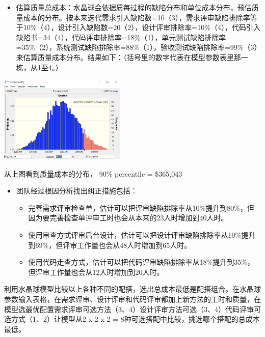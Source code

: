 \begin{itemize}
\tightlist
\item
  估算质量总成本：水晶球会依据质每过程的缺陷分布和单位成本分布，预估质量成本的分布。按本来迭代需求引入缺陷数=10（3），需求评审缺陷排除率等于10\%（4），设计引入缺陷数=20（2），设计评审排除率=10\%（4），代码引入缺陷书=34（4），代码评审排除率=18\%（1），单元测试缺陷排除率=35\%（2），系统测试缺陷排除率=88\%（1），验收测试缺陷排除率=99\%（3）来估算质量成本分布。结果如下：（括号里的数字代表在模型参数表里那一栋，从1至4。）
\end{itemize}



\includegraphics[width=6cm]{startQUA.PNG}

从上图看到质量成本的分布， 90\% percentile = \$365,043

\begin{itemize}
\tightlist
\item
  团队经过根因分析找出纠正措施包括：

  \begin{itemize}
  \tightlist
  \item
    完善需求评审检查单，估计可以把评审缺陷排除率从10\%提升到80\%，但因为要完善检查单评审工时也会从本来的23人时增加到40人时。
  \item
    使用审查方式评审后台设计，估计可以把设计评审缺陷排除率从10\%提升到69\%，但评审工作量也会从48人时增加到65人时。
  \item
    使用代码走查方式，估计可以把代码评审缺陷排除率从18\%提升到35\%，但评审工作量也会从12人时增加到20人时。
  \end{itemize}
\end{itemize}

利用水晶球模型比较以上各种不同的配搭，选出总成本最低是配搭组合。在水晶球参数输入表格，在需求评审、设计评审和代码评审都加上新方法的工时和质量，在模型选最优配置需求评审可选方法（3、4）设计评审方法可选（3、4）代码评审可选方式（1、2）让模型从2
x 2 x 2 = 8种可选搭配中比较，挑选哪个搭配的总成本最低。

